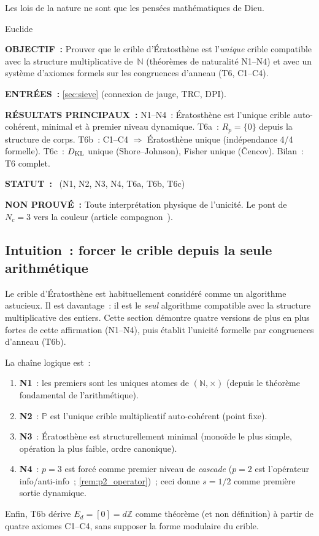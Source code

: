 \documentclass[12pt,a4paper]{article}
\begin{document}
\epigraph{Les lois de la nature ne sont que les pensées mathématiques de Dieu.}{Euclide}

\begin{statusbox}
\textbf{OBJECTIF~:}
  Prouver que le crible d'Ératosthène est l'\emph{unique} crible
  compatible avec la structure multiplicative de~$\mathbb{N}$
  (théorèmes de naturalité N1--N4) et avec un système d'axiomes
  formels sur les congruences d'anneau (T6, C1--C4).

\textbf{ENTRÉES~:}
  \cref{sec:sieve} (connexion de jauge, TRC, DPI).

\textbf{RÉSULTATS PRINCIPAUX~:}
  N1--N4~: Ératosthène est l'unique crible auto-cohérent, minimal et
  à premier niveau dynamique.
  T6a~: $R_p = \{0\}$ depuis la structure de corps.
  T6b~: C1--C4 $\Rightarrow$ Ératosthène unique (indépendance 4/4
  formelle).
  T6c~: $D_{\mathrm{KL}}$ unique (Shore--Johnson), Fisher unique (\v{C}encov).
  Bilan~: T6 complet.

\textbf{STATUT~:}
  \THMTAG~(N1, N2, N3, N4, T6a, T6b, T6c)

\textbf{NON PROUVÉ~:}
  Toute interprétation physique de l'unicité.
  Le pont de $N_c = 3$ vers la couleur (article
  compagnon~\cite{companion_M5}).
\end{statusbox}

\subsection{Intuition~: forcer le crible depuis la seule arithmétique}
\label{sec:ch2_intuition}

Le crible d'Ératosthène est habituellement considéré comme un
algorithme astucieux. Il est davantage~: il est le \emph{seul}
algorithme compatible avec la structure multiplicative des entiers.
Cette section démontre quatre versions de plus en plus fortes de cette
affirmation (N1--N4), puis établit l'unicité formelle par
congruences d'anneau (T6b).

La chaîne logique est~:
\begin{enumerate}
\item \textbf{N1}~: les premiers sont les uniques atomes de
  $(\mathbb{N}, \times)$ (depuis le théorème fondamental de
  l'arithmétique).
\item \textbf{N2}~: $\mathbb{P}$ est l'unique crible multiplicatif
  auto-cohérent (point fixe).
\item \textbf{N3}~: Ératosthène est structurellement minimal (monoïde
  le plus simple, opération la plus faible, ordre canonique).
\item \textbf{N4}~: $p = 3$ est forcé comme premier niveau de
  \emph{cascade} ($p = 2$ est l'opérateur info/anti-info~;
  \cref{rem:p2_operator})~; ceci donne $s = 1/2$ comme première sortie
  dynamique.
\end{enumerate}
Enfin, T6b dérive $E_d = [0] = d\mathbb{Z}$ comme théorème (et non
définition) à partir de quatre axiomes C1--C4, sans supposer la
forme modulaire du crible.
\end{document}
